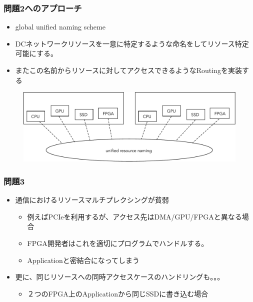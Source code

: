 \documentclass[dvipdfmx,9pt,notheorems]{beamer}
\theoremstyle{definition}
\begin{document}
\begin{frame}\frametitle{問題2へのアプローチ}
	\begin{itemize}
		\item global unified naming scheme
		\item DCネットワークリソースを一意に特定するような命名をしてリソース特定可能にする。
		\item またこの名前からリソースに対してアクセスできるようなRoutingを実装する
	\end{itemize}
  \begin{figure}[htb]
		\includegraphics[width=\linewidth]{fig/ez_FPGA_unified_naming_scheme.pdf}
  \end{figure}
	\pnote{
	}
\end{frame}

\begin{frame}\frametitle{問題3}
	\begin{itemize}
		\item 通信におけるリソースマルチプレクシングが貧弱
			\begin{itemize}
				\item 例えばPCIeを利用するが、アクセス先はDMA/GPU/FPGAと異なる場合
				\item FPGA開発者はこれを適切にプログラムでハンドルする。
				\item Applicationと密結合になってしまう
			\end{itemize}
		\item 更に、同じリソースへの同時アクセスケースのハンドリングも。。。
			\begin{itemize}
				\item ２つのFPGA上のApplicationから同じSSDに書き込む場合
			\end{itemize}
	\end{itemize}
	\pnote{
	}
\end{frame}
\end{document}
